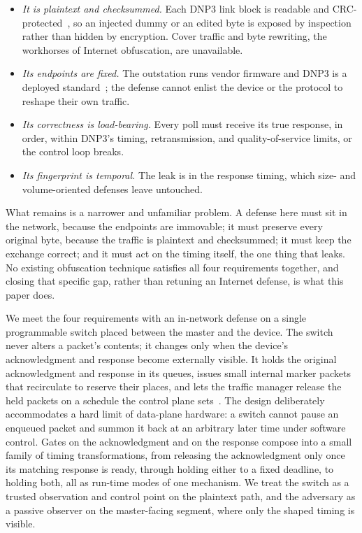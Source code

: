 \documentclass[conference]{IEEEtran}
\begin{document}
\begin{itemize}
\item \emph{It is plaintext and checksummed.} Each DNP3 link block is readable and
CRC-protected~\cite{east2009taxonomy, fovino2010modbus}, so an injected dummy or an edited byte is
exposed by inspection rather than hidden by encryption. Cover traffic and byte rewriting, the
workhorses of Internet obfuscation, are unavailable.
\item \emph{Its endpoints are fixed.} The outstation runs vendor firmware and DNP3 is a deployed
standard~\cite{east2009taxonomy, cardenas2011attacks}; the defense cannot enlist the device or the
protocol to reshape their own traffic.
\item \emph{Its correctness is load-bearing.} Every poll must receive its true response, in order,
within DNP3's timing, retransmission, and quality-of-service limits, or the control loop breaks.
\item \emph{Its fingerprint is temporal.} The leak is in the response timing, which size- and
volume-oriented defenses leave untouched.
\end{itemize}

What remains is a narrower and unfamiliar problem. A defense here must sit in the network, because the
endpoints are immovable; it must preserve every original byte, because the traffic is plaintext and
checksummed; it must keep the exchange correct; and it must act on the timing itself, the one thing
that leaks. No existing obfuscation technique satisfies all four requirements together, and closing
that specific gap, rather than retuning an Internet defense, is what this paper does.

We meet the four requirements with an in-network defense on a single programmable switch placed between
the master and the device. The switch never alters a packet's contents; it changes only when the
device's acknowledgment and response become externally visible. It holds the original acknowledgment
and response in its queues, issues small internal marker packets that recirculate to reserve their
places, and lets the traffic manager release the held packets on a schedule the control plane
sets~\cite{wang2020pinot, meier2022ditto, kfoury2021p4survey}. The design deliberately accommodates a
hard limit of data-plane hardware: a switch cannot pause an enqueued packet and summon it back at an
arbitrary later time under software control. Gates on the acknowledgment and on the response compose
into a small family of timing transformations, from releasing the acknowledgment only once its matching
response is ready, through holding either to a fixed deadline, to holding both, all as run-time modes of
one mechanism. We treat the switch as a trusted observation and control point on the plaintext path,
and the adversary as a passive observer on the master-facing segment, where only the shaped timing is
visible.
\end{document}
